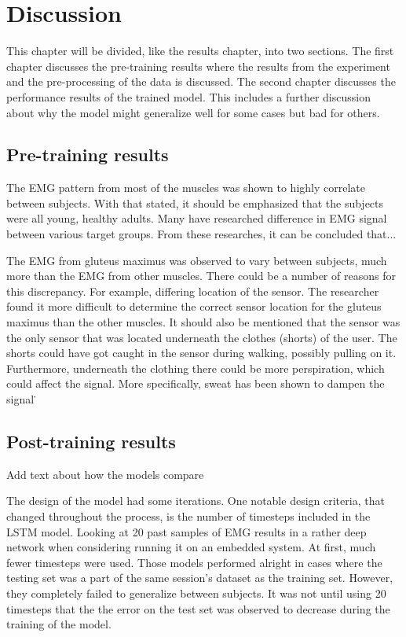 \documentclass[../main.tex]{subfiles}
\begin{document}
\chapter{Discussion}
\label{sec:discussion}
This chapter will be divided, like the results chapter, into two sections. 
The first chapter discusses the pre-training results where the results from the experiment and the pre-processing of the data is discussed.
The second chapter discusses the performance results of the trained model.
This includes a further discussion about why the model might generalize well for some cases but bad for others.

\section{Pre-training results}
\label{sec:discussion_pre-training-results}
The \ac{EMG} pattern from most of the muscles was shown to highly correlate between subjects.
With that stated, it should be emphasized that the subjects were all young, healthy adults.
Many have researched difference in \ac{EMG} signal between various target groups.
From these researches, it can be concluded that...

The \ac{EMG} from gluteus maximus was observed to vary between subjects, much more than the \ac{EMG} from other muscles.
There could be a number of reasons for this discrepancy.
For example, differing location of the sensor.
The researcher found it more difficult to determine the correct sensor location for the gluteus maximus than the other muscles.
It should also be mentioned that the sensor was the only sensor that was located underneath the clothes (shorts) of the user.
The shorts could have got caught in the sensor during walking, possibly pulling on it.
Furthermore, underneath the clothing there could be more perspiration, which could affect the signal.
More specifically, sweat has been shown to dampen the signal \.

\section{Post-training results}
\label{sec:discussion_post-training-results}
Add text about how the models compare

The design of the model had some iterations. 
One notable design criteria, that changed throughout the process, is the number of timesteps included in the \ac{LSTM} model.
Looking at 20 past samples of \ac{EMG} results in a rather deep network when considering running it on an embedded system.
At first, much fewer timesteps were used.
Those models performed alright in cases where the testing set was a part of the same session's dataset as the training set.
However, they completely failed to generalize between subjects.
It was not until using 20 timesteps that the the error on the test set was observed to decrease during the training of the model.
\end{document}
